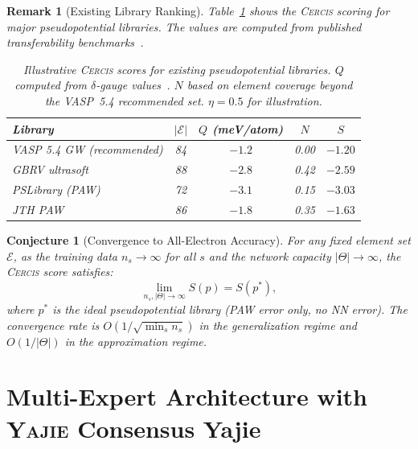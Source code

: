 \documentclass[11pt,a4paper]{article}
\newtheorem{conjecture}[theorem]{Conjecture}
\newtheorem{remark}[theorem]{Remark}
\theoremstyle{definition}
\newcommand{\Yajie}{\textsc{Yajie}}
\newcommand{\Cercis}{\textsc{Cercis}}
\begin{document}
\begin{remark}[Existing Library Ranking]
Table~\ref{tab:cercis_ranking} shows the \Cercis{} scoring for major pseudopotential libraries. The values are computed from published transferability benchmarks~\cite{Lejaeghere2016,Jollet2014}.

\begin{table}[htbp]
\centering
\caption{Illustrative \Cercis{} scores for existing pseudopotential libraries. $Q$ computed from $\delta$-gauge values~\cite{Lejaeghere2016}. $N$ based on element coverage beyond the VASP~5.4 recommended set. $\eta = 0.5$ for illustration.}
\label{tab:cercis_ranking}
\begin{tabular}{lcccc}
\toprule
Library & $|\mathcal{E}|$ & $Q$ (meV/atom) & $N$ & $S$ \\
\midrule
VASP 5.4 GW (recommended) & 84 & $-1.2$ & 0.00 & $-1.20$ \\
GBRV ultrasoft & 88 & $-2.8$ & 0.42 & $-2.59$ \\
PSLibrary (PAW) & 72 & $-3.1$ & 0.15 & $-3.03$ \\
JTH PAW & 86 & $-1.8$ & 0.35 & $-1.63$ \\
\bottomrule
\end{tabular}
\end{table}
\end{remark}

\begin{conjecture}[Convergence to All-Electron Accuracy]\label{conj:convergence}
For any fixed element set $\mathcal{E}$, as the training data $n_s \to \infty$ for all $s$ and the network capacity $|\Theta| \to \infty$, the \Cercis{} score satisfies:
\begin{equation}
\lim_{n_s, |\Theta| \to \infty} S(p) = S(p^*),
\end{equation}
where $p^*$ is the ideal pseudopotential library (PAW error only, no NN error). The convergence rate is $O(1/\sqrt{\min_s n_s})$ in the generalization regime and $O(1/|\Theta|)$ in the approximation regime.
\end{conjecture}

\section{Multi-Expert Architecture with \Yajie{} Consensus Yajie}
\label{sec:multi_expert}
\end{document}
